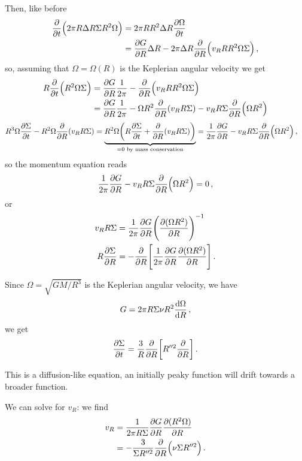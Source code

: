 \documentclass[main.tex]{subfiles}
\begin{document}
Then, like before 
%
\begin{align}
\pdv{}{t} \qty(2 \pi R \Delta R \Sigma R^2 \Omega ) &= 2 \pi R R^2 \Delta R \pdv{\Omega }{t}   \\
&= \pdv{G}{R} \Delta R  - 2 \pi \Delta R \pdv{}{R} \qty(v_R R R^2 \Omega \Sigma )
\,,
\end{align}
%
so, assuming that \(\Omega = \Omega (R)\) is the Keplerian angular velocity we get 
%
\begin{align}
R \pdv{}{t} \qty(R^2\Omega \Sigma ) &= \pdv{G}{R} \frac{1}{2 \pi } - \pdv{}{R} \qty(v_R R R^2 \Omega \Sigma )  \\
&= \pdv{G}{R} \frac{1}{2 \pi } - \Omega R^2 \pdv{}{R} \qty(v_R R \Sigma ) - v_R R \Sigma \pdv{}{R} \qty(\Omega R^2) 
\end{align}
\begin{align}
R^3 \Omega \pdv{\Sigma }{t} - R^2 \Omega \pdv{}{R} \qty(v_R R \Sigma ) 
= \underbrace{R^2 \Omega \qty(R \pdv{\Sigma }{t} + \pdv{}{R} \qty(v_R R \Sigma ))}_{= 0 \text{ by mass conservation}}
&= \frac{1}{2 \pi } \pdv{G}{R} - v_R R \Sigma \pdv{}{R} \qty( \Omega R^2)
\,,
\end{align}
%
so the momentum equation reads 
%
\begin{align}
\frac{1}{2 \pi } \pdv{G}{R} - v_R R \Sigma \pdv{}{R} \qty(\Omega R^2) = 0
\,,
\end{align}
%
or 
%
\begin{align}
v_R R \Sigma &= \frac{1}{2 \pi } \pdv{G}{R} \qty(\pdv{(\Omega R^2)}{R})^{-1}  \\
R \pdv{\Sigma }{R} &= - \pdv{}{R} \qty[ \frac{1}{2 \pi } \pdv{G}{R} \pdv{(\Omega R^2)}{R}]
\,.
\end{align}

Since \(\Omega = \sqrt{GM / R^3} \) is the Keplerian angular velocity, we have 
%
\begin{align}
G = 2 \pi R \Sigma \nu R^2 \dv{\Omega }{R}
\,,
\end{align}
%
we get 
%
\begin{align}
\pdv{\Sigma }{t} = \frac{3}{R} \pdv{}{R} \qty[R^{\prime \prime 2} \pdv{}{R} (\nu \Sigma R^{\prime \prime 2})] 
\,.
\end{align}

This is a diffusion-like equation, an initially peaky function will drift towards a broader function. 

We can solve for \(v_R\): we find 
%
\begin{align}
v_R &= \frac{1}{2 \pi R \Sigma } \pdv{G}{R} \pdv{(R^2 \Omega )}{R}  \\
&= - \frac{3}{\Sigma R^{\prime \prime 2} } \pdv{}{R} \qty(\nu \Sigma R^{\prime \prime 2}) 
\,.
\end{align}
\end{document}
